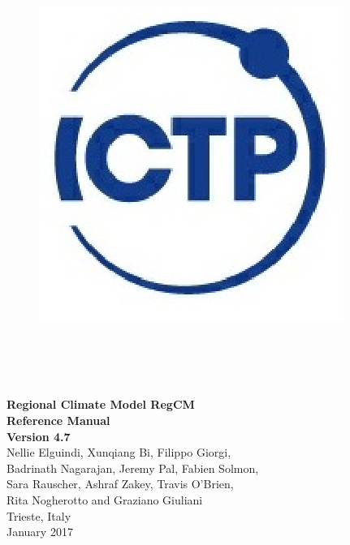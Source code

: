 \documentclass[10pt,twoside,a4paper]{report}
\begin{document}
\begin{titlepage}

\begin{figure}
\vspace{-35pt}
\begin{center}
\includegraphics{ICTP_logo}
\end{center}
\end{figure}

\\
 \\
 \\

\vspace{3cm}

\begin{boxedminipage}{\textwidth}
\begin{center}
\vspace{0.5cm}
{\Large
{\bf Regional Climate Model RegCM\\Reference Manual} \\
\vspace{0.2cm}
{\bf Version 4.7}}\\
\vspace{0.5cm}
Nellie Elguindi, Xunqiang Bi, Filippo Giorgi,\\
Badrinath Nagarajan, Jeremy Pal, Fabien Solmon,\\
Sara Rauscher, Ashraf Zakey, Travis O'Brien,\\
Rita Nogherotto and Graziano Giuliani\\
Trieste, Italy\\January 2017
\vspace{0.5cm}
\end{center}
\end{boxedminipage}

\end{titlepage}

\cleardoublepage

\cleardoublepage
\tableofcontents
\cleardoublepage

\listoffigures
\listoftables
\cleardoublepage











\end{document}
